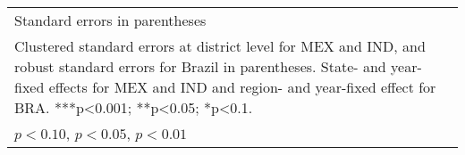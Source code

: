 \begin{table}[htbp]
\begin{tabular}{l*{9}{c}}
\hline\hline
\multicolumn{10}{l}{\footnotesize Standard errors in parentheses}\\
\multicolumn{10}{l}{\footnotesize Clustered standard errors at district level for MEX and IND, and robust standard errors for Brazil in parentheses. State- and year-fixed effects for MEX and IND and region- and year-fixed effect for BRA. ***p<0.001; **p<0.05; *p<0.1.}\\
\multicolumn{10}{l}{\footnotesize \sym{*} \(p<0.10\), \sym{**} \(p<0.05\), \sym{***} \(p<0.01\)}\\
\end{tabular}
\end{table}
